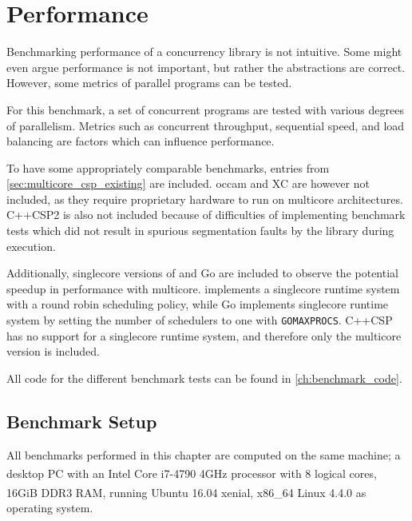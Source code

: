 
\chapter{Performance}
\label{ch:performance}


Benchmarking performance of a concurrency library is not intuitive. Some might even argue performance is not important, but rather the abstractions are correct. However, some metrics of parallel programs can be tested.

For this benchmark, a set of concurrent programs are tested with various degrees of parallelism. Metrics such as concurrent throughput, sequential speed, and load balancing are factors which can influence performance.

To have some appropriately comparable benchmarks, entries from \cref{sec:multicore_csp_existing} are included. occam and XC are however not included, as they require proprietary hardware to run on multicore architectures. C++CSP2 is also not included because of difficulties of implementing benchmark tests which did not result in spurious segmentation faults by the library during execution.

Additionally, singlecore versions of \Proxc{} and Go are included to observe the potential speedup in performance with multicore. \Proxc{} implements a singlecore runtime system with a round robin scheduling policy, while Go implements singlecore runtime system by setting the number of schedulers to one with \texttt{GOMAXPROCS}. C++CSP has no support for a singlecore runtime system, and therefore only the multicore version is included.

All code for the different benchmark tests can be found in \cref{ch:benchmark_code}.


\section{Benchmark Setup}
\label{sec:benchmark_setup}


All benchmarks performed in this chapter are computed on the same machine; a desktop PC with an Intel\textsuperscript{\textregistered} Core\textsuperscript{\texttrademark} i7-4790 4GHz processor with 8 logical cores, 16GiB DDR3 RAM, running Ubuntu\textsuperscript{\textregistered} 16.04 xenial, x86\_64 Linux\textsuperscript{\textregistered} 4.4.0 as operating system.

